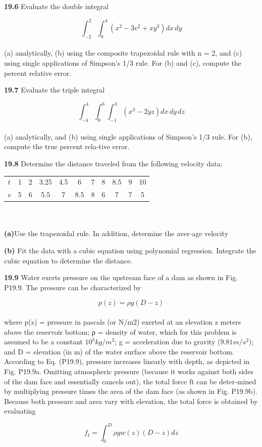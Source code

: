 \documentclass[../main.tex]{subfiles}
\begin{document}
\begin{multicols}{2}
\textbf{19.6} Evaluate the double integral

	$$\int^{2}_{-2}\int^{4}_{0}(x^{2}-3v^{2}+xy^{3})dx\,dy$$\\
(a) analytically, (b) using the composite trapezoidal rule
with n = 2, and (c) using single applications of Simpson's
1/3 rule. For (b) and (c), compute the percent relative error.

\textbf{19.7} Evaluate the triple integral
	
	$$\int^{4}_{-4}\int^{6}_{0}\int^{3}_{-1}(x^{3}-2yz)dx\,dy\,dz$$\\
(a) analytically, and (b) using single applications of
Simpson's 1/3 rule. For (b), compute the true percent rela-tive error.

\textbf{19.8} Determine the distance traveled from the following
velocity data:\\
\begin{tabular}{ccccccccccc}
	\hline
\tiny{$t$} & \tiny{1} & \tiny{2} & \tiny{3.25} & \tiny{4.5} & \tiny{6} & \tiny{7} & \tiny{8} & \tiny{8.5} & \tiny{9} & \tiny{10}\\
\tiny{$v$} & \tiny{5} & \tiny{6} & \tiny{5.5} & \tiny{7} & \tiny{8.5} & \tiny{8} & \tiny{6} & \tiny{7} & \tiny{7} & \tiny{5}\\ \hline
\end{tabular}\\
\vspace{0.1pt}\\

\textbf{(a)}Use the trapezoidal rule. In addition, determine the aver-age velocity

\textbf{(b)} Fit the data with a cubic equation using polynomial
regression. Integrate the cubic equation to determine the
distance.

\textbf{19.9} Water exerts pressure on the upstream face of a dam as
shown in Fig. P19.9. The pressure can be characterized by

	$$p(z) = \rho g(D-z)$$\\
where p(z) = pressure in pascals (or N/m2) exerted at an
elevation z meters above the reservoir bottom; ρ = density of
water, which for this problem is assumed to be a constant
$10^3 kg/m^3$; g = acceleration due to gravity ($9.81 m/s^2$); and
D = elevation (in m) of the water surface above the reservoir
bottom. According to Eq. (P19.9), pressure increases linearly
with depth, as depicted in Fig. P19.9a. Omitting atmospheric
pressure (because it works against both sides of the dam face
and essentially cancels out), the total force ft can be deter-mined by multiplying pressure times the area of the dam face
(as shown in Fig. P19.9b). Because both pressure and area
vary with elevation, the total force is obtained by evaluating

	$$f_t=\int^{D}_{0}\rho gw(z)(D-z)dz$$

\end{multicols}
\end{document}
